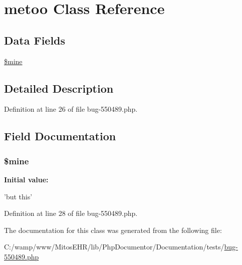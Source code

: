 \hypertarget{classmetoo}{\section{metoo \-Class \-Reference}
\label{classmetoo}
}
\subsection*{\-Data \-Fields}
\begin{DoxyCompactItemize}
\item 
\hyperlink{classmetoo_a7f08163342a9a70a3f7db1d13e6ccc8d}{\$mine}
\end{DoxyCompactItemize}


\subsection{\-Detailed \-Description}


\-Definition at line 26 of file bug-\/550489.\-php.



\subsection{\-Field \-Documentation}
\hypertarget{classmetoo_a7f08163342a9a70a3f7db1d13e6ccc8d}{
\subsubsection[{\$mine}]{\setlength{\rightskip}{0pt plus 5cm}\$mine}}\label{classmetoo_a7f08163342a9a70a3f7db1d13e6ccc8d}
{\bfseries \-Initial value\-:}
\begin{DoxyCode}
 
        'but this'
\end{DoxyCode}


\-Definition at line 28 of file bug-\/550489.\-php.



\-The documentation for this class was generated from the following file\-:\begin{DoxyCompactItemize}
\item 
\-C\-:/wamp/www/\-Mitos\-E\-H\-R/lib/\-Php\-Documentor/\-Documentation/tests/\hyperlink{bug-550489_8php}{bug-\/550489.\-php}\end{DoxyCompactItemize}
